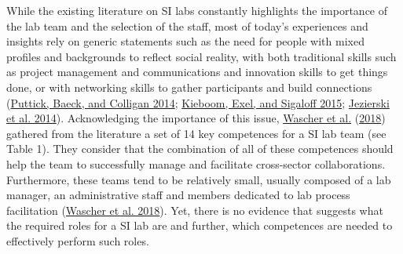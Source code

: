 \documentclass[AMA,STIX1COL,APA,STIX2COL]{WileyNJD-v2}
\begin{document}
While the existing literature on SI labs constantly highlights the
importance of the lab team and the selection of the staff, most of
today's experiences and insights rely on generic statements such as the
need for people with mixed profiles and backgrounds to reflect social
reality, with both traditional skills such as project management and
communications and innovation skills to get things done, or with
networking skills to gather participants and build connections
(\protect\hyperlink{ref-Puttick2014-Teams}{Puttick, Baeck, and Colligan
2014}; \protect\hyperlink{ref-Kieboom2015}{Kieboom, Exel, and Sigaloff
2015}; \protect\hyperlink{ref-Jezierski2014}{Jezierski et al. 2014}).
Acknowledging the importance of this issue,
\protect\hyperlink{ref-Wascher2018}{Wascher et al.}
(\protect\hyperlink{ref-Wascher2018}{2018}) gathered from the literature
a set of 14 key competences for a SI lab team (see Table 1). They
consider that the combination of all of these competences should help
the team to successfully manage and facilitate cross-sector
collaborations. Furthermore, these teams tend to be relatively small,
usually composed of a lab manager, an administrative staff and members
dedicated to lab process facilitation
(\protect\hyperlink{ref-Wascher2018}{Wascher et al. 2018}). Yet, there
is no evidence that suggests what the required roles for a SI lab are
and further, which competences are needed to effectively perform such
roles.

\providecommand{\docline}[3]{\noalign{\global\setlength{\arrayrulewidth}{#1}}\arrayrulecolor[HTML]{#2}\cline{#3}}

\setlength{\tabcolsep}{2pt}

\renewcommand*{\arraystretch}{1.5}
\end{document}
